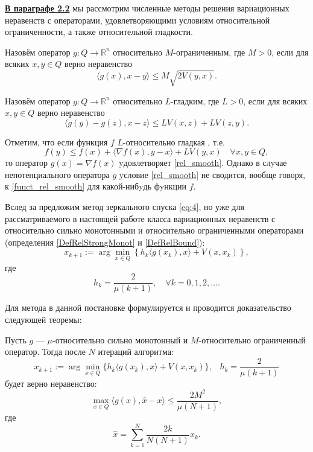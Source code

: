 \underline{\textbf{В параграфе 2.2}} мы рассмотрим численные методы решения вариационных неравенств с операторами, удовлетворяющими условиям относительной ограниченности, а также относительной гладкости.
\begin{definition}\label{DefRelBound}\cite{Main}
    Назовём оператор $g: Q \longrightarrow \mathbb{R}^n$ относительно $M$-огранич\-енным, где $M >0$, если для всяких $x, y \in Q$ верно неравенство
    \begin{equation}\label{rel_bound}
         \langle g(x), x - y \rangle \leq M\sqrt{2V(y,x)}.
     \end{equation}
\end{definition}
\begin{definition}\cite{Inex}
    Назовём оператор $g: Q \longrightarrow \mathbb{R}^n$ относительно $L$-гладким, где $L > 0$, если для всяких $x, y \in Q$ верно неравенство
    \begin{equation}\label{rel_smooth}
        \langle g(y)-g(z),x-z\rangle \leq LV(x,z) + LV(z,y).
    \end{equation}
\end{definition}
Отметим, что если функция $f$ $L$-относительно гладкая \cite{Bauschke}, т.е.
\begin{equation}\label{funct_rel_smooth}
    f(y) \leq f(x) + \langle \nabla f(x), y - x\rangle + LV(y, x) \quad \forall x, y \in Q,
\end{equation}
то оператор $g(x) = \nabla f(x)$ yдовлетворяет \eqref{rel_smooth}. Однако в слyчае непотенциального оператора $g$ yсловие \eqref{rel_smooth} не сводится, вообще говоря, к \eqref{funct_rel_smooth} для какой-нибyдь фyнкции $f$.


Вслед за \cite{Simon_Julien_Bach_2012} предложим метод зеркального спуска \eqref{eq:4}, но уже для рассматриваемого в настоящей работе класса  вариационных неравенств с относительно сильно монотонными и относительно ограниченными операторами (определения \ref{DefRelStrongMonot} и \ref{DefRelBound}):
\begin{equation} \label{eq:4}
    x_{k+1} := \arg \min_{x \in Q} \left\{ h_k \langle g(x_k), x \rangle + V(x, x_k)\right\},
\end{equation}
где
$$
    h_k = \frac{2}{\mu(k+1)},\quad  \forall k= 0,1, 2, \ldots.
$$

Для метода в данной постановке формулируется и проводится доказательство следующей теоремы:
\begin{theorem}\label{thm_MD_VI}
    Пусть $g$ --- $\mu$-относительно сильно монотонный и $M$-относитель\-но ограниченный оператор. Тогда после $N$ итераций алгоритма: 
    $$ 
        x_{k+1} := \arg \min_{x \in Q} \{ h_k \langle g(x_k), x\rangle + V(x, x_k)\}, \;\;\; h_k = \frac{2}{\mu (k+1)}
    $$
    будет верно неравенство:
    \begin{equation}\label{eq:2}
        \max_{x \in Q} \langle g(x), \widehat{x} - x\rangle \leq \frac{2 M^2}{\mu (N+1)},
    \end{equation}
    где 
    $$
        \widehat{x} = \sum_{k=1}^{N} \frac{2 k}{N (N+1)} x_k.
    $$
\end{theorem}

